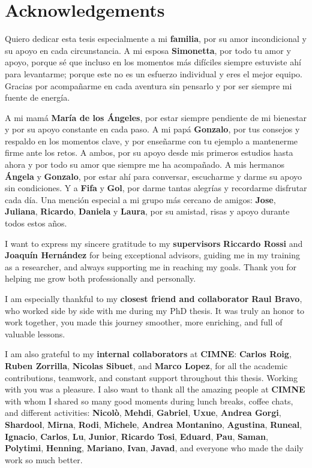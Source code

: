 \chapter*{Acknowledgements}

\noindent
Quiero dedicar esta tesis especialmente a mi \textbf{familia}, por su amor incondicional y su apoyo en cada circunstancia. A mi esposa \textbf{Simonetta}, por todo tu amor y apoyo, porque sé que incluso en los momentos más difíciles siempre estuviste ahí para levantarme; porque este no es un esfuerzo individual y eres el mejor equipo. Gracias por acompañarme en cada aventura sin pensarlo y por ser siempre mi fuente de energía.

A mi mamá \textbf{María de los Ángeles}, por estar siempre pendiente de mi bienestar y por su apoyo constante en cada paso. A mi papá \textbf{Gonzalo}, por tus consejos y respaldo en los momentos clave, y por enseñarme con tu ejemplo a mantenerme firme ante los retos. A ambos, por su apoyo desde mis primeros estudios hasta ahora y por todo su amor que siempre me ha acompañado. A mis hermanos \textbf{Ángela} y \textbf{Gonzalo}, por estar ahí para conversar, escucharme y darme su apoyo sin condiciones. Y a \textbf{Fifa} y \textbf{Gol}, por darme tantas alegrías y recordarme disfrutar cada día. Una mención especial a mi grupo más cercano de amigos: \textbf{Jose}, \textbf{Juliana}, \textbf{Ricardo}, \textbf{Daniela} y \textbf{Laura}, por su amistad, risas y apoyo durante todos estos años.

\vspace{0.5cm}

I want to express my sincere gratitude to my \textbf{supervisors} \textbf{Riccardo Rossi} and \textbf{Joaquín Hernández} for being exceptional advisors, guiding me in my training as a researcher, and always supporting me in reaching my goals. Thank you for helping me grow both professionally and personally.

I am especially thankful to my \textbf{closest friend and collaborator} \textbf{Raul Bravo}, who worked side by side with me during my PhD thesis. It was truly an honor to work together, you made this journey smoother, more enriching, and full of valuable lessons.

I am also grateful to my \textbf{internal collaborators} at \textbf{CIMNE}: \textbf{Carlos Roig}, \textbf{Ruben Zorrilla}, \textbf{Nicolas Sibuet}, and \textbf{Marco Lopez}, for all the academic contributions, teamwork, and constant support throughout this thesis. Working with you was a pleasure. I also want to thank all the amazing people at \textbf{CIMNE} with whom I shared so many good moments during lunch breaks, coffee chats, and different activities: \textbf{Nicolò}, \textbf{Mehdi}, \textbf{Gabriel}, \textbf{Uxue}, \textbf{Andrea Gorgi}, \textbf{Shardool}, \textbf{Mirna}, \textbf{Rodi}, \textbf{Michele}, \textbf{Andrea Montanino}, \textbf{Agustina}, \textbf{Runeal}, \textbf{Ignacio}, \textbf{Carlos}, \textbf{Lu}, \textbf{Junior}, \textbf{Ricardo Tosi}, \textbf{Eduard}, \textbf{Pau}, \textbf{Saman}, \textbf{Polytimi}, \textbf{Henning}, \textbf{Mariano}, \textbf{Ivan}, \textbf{Javad}, and everyone who made the daily work so much better.

